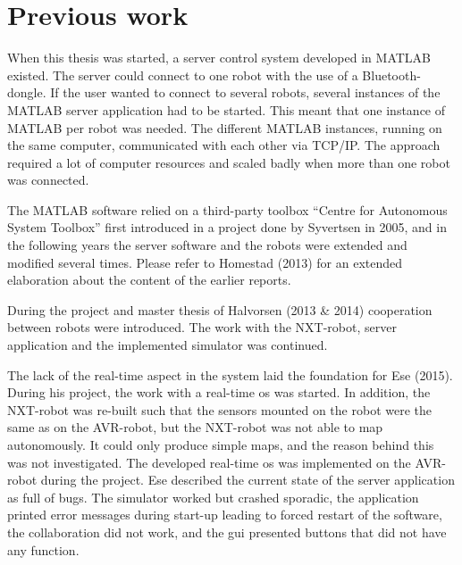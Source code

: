 \section{Previous work}
When this thesis was started, a server control system developed in MATLAB existed. The server could connect to one robot with the use of a Bluetooth-dongle. If the user wanted to connect to several robots, several instances of the MATLAB server application had to be started. This meant that one instance of MATLAB per robot was needed. The different MATLAB instances, running on the same computer, communicated with each other via TCP/IP. The approach required a lot of computer resources and scaled badly when more than one robot was connected.

The MATLAB software relied on a third-party toolbox ``Centre for Autonomous System Toolbox'' first introduced in a project done by Syvertsen in 2005, and in the following years the server software and the robots were extended and modified several times. Please refer to Homestad (2013) for an extended elaboration about the content of the earlier reports.

During the project and master thesis of Halvorsen (2013 \& 2014) cooperation between robots were introduced. The work with the NXT-robot, server application and the implemented simulator was continued.

The lack of the real-time aspect in the system laid the foundation for Ese (2015). During his project, the work with a real-time \acrshort{os} was started. In addition, the NXT-robot was re-built such that the sensors mounted on the robot were the same as on the AVR-robot, but the NXT-robot was not able to map autonomously. It could only produce simple maps, and the reason behind this was not investigated. The developed real-time \acrshort{os} was implemented on the AVR-robot during the project. Ese described the current state of the server application as full of bugs. The simulator worked but crashed sporadic, the application printed error messages during start-up leading to forced restart of the software, the collaboration did not work, and the \acrshort{gui} presented buttons that did not have any function.
